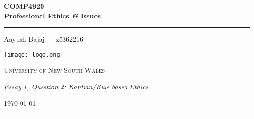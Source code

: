 \begin{titlepage}
    \centering

    {\Huge\bfseries COMP4920\\Professional Ethics \textit{\&} Issues\par}
    \vspace{0.5cm}
    \hrule
    \vspace{0.5cm}


    \begin{center}
	{\Large
        Aayush Bajaj --- z5362216
	}
    \end{center}
    \dotfill

    \vspace{1cm}

    \texttt{[image: logo.png]}

	{\large \textsc{University of New South Wales}\par}
    \vspace{1cm}

    {\large \textit{Essay 1, Question 2: Kantian/Rule based Ethics.}\par}

    \vspace{1cm}


    {\large \today\par}
    \vspace{1cm}
    \hrule

\end{titlepage}
